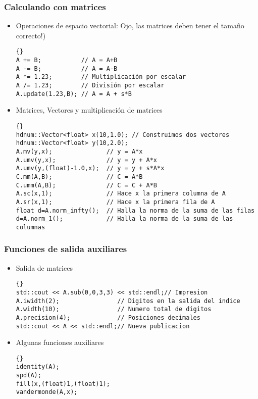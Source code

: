 \begin{frame}[fragile]
\frametitle{Calculando con matrices}
\begin{itemize}
\item Operaciones de espacio vectorial: Ojo, las matrices deben
tener el tamaño correcto!)\\
{\footnotesize{\begin{lstlisting}{}
A += B;           // A = A+B
A -= B;           // A = A-B
A *= 1.23;        // Multiplicación por escalar
A /= 1.23;        // División por escalar
A.update(1.23,B); // A = A + s*B
\end{lstlisting}}}
\item Matrices, Vectores y multiplicación de matrices\\
{\footnotesize{\begin{lstlisting}{}
hdnum::Vector<float> x(10,1.0); // Construimos dos vectores
hdnum::Vector<float> y(10,2.0);
A.mv(y,x);               // y = A*x
A.umv(y,x);              // y = y + A*x
A.umv(y,(float)-1.0,x);  // y = y + s*A*x
C.mm(A,B);               // C = A*B
C.umm(A,B);              // C = C + A*B
A.sc(x,1);               // Hace x la primera columna de A
A.sr(x,1);               // Hace x la primera fila de A
float d=A.norm_infty();  // Halla la norma de la suma de las filas
d=A.norm_1();            // Halla la norma de la suma de las columnas
\end{lstlisting}}}
\end{itemize}
\end{frame}

\begin{frame}[fragile]
\frametitle{Funciones de salida auxiliares}
\begin{itemize}
\item Salida de matrices \\
{\footnotesize{\begin{lstlisting}{}
std::cout << A.sub(0,0,3,3) << std::endl;// Impresion
A.iwidth(2);                // Digitos en la salida del indice
A.width(10);                // Numero total de digitos
A.precision(4);             // Posiciones decimales
std::cout << A << std::endl;// Nueva publicacion
\end{lstlisting}}}
\item Algunas funciones auxiliares 
{\footnotesize{\begin{lstlisting}{}
identity(A);
spd(A);
fill(x,(float)1,(float)1);
vandermonde(A,x);
\end{lstlisting}}}
\end{itemize}
\end{frame}

